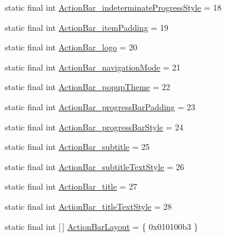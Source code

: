 \begin{DoxyCompactItemize}
\item 
static final int \mbox{\hyperlink{classandroid_1_1support_1_1v7_1_1appcompat_1_1R_1_1styleable_a7577229b463e9b7130c54def73c2afd7}{Action\+Bar\+\_\+indeterminate\+Progress\+Style}} = 18
\item 
static final int \mbox{\hyperlink{classandroid_1_1support_1_1v7_1_1appcompat_1_1R_1_1styleable_a315cf68c96fdaec15e402b40dda940d7}{Action\+Bar\+\_\+item\+Padding}} = 19
\item 
static final int \mbox{\hyperlink{classandroid_1_1support_1_1v7_1_1appcompat_1_1R_1_1styleable_a56f0a3f5be9ab67dec4dd2251204ba70}{Action\+Bar\+\_\+logo}} = 20
\item 
static final int \mbox{\hyperlink{classandroid_1_1support_1_1v7_1_1appcompat_1_1R_1_1styleable_afedf914ccaf1bb5ca9002e42ed54d533}{Action\+Bar\+\_\+navigation\+Mode}} = 21
\item 
static final int \mbox{\hyperlink{classandroid_1_1support_1_1v7_1_1appcompat_1_1R_1_1styleable_ad01a2a11a37482bb9449f38fbad79527}{Action\+Bar\+\_\+popup\+Theme}} = 22
\item 
static final int \mbox{\hyperlink{classandroid_1_1support_1_1v7_1_1appcompat_1_1R_1_1styleable_a3d7a77efb74431150b14219b00be5bef}{Action\+Bar\+\_\+progress\+Bar\+Padding}} = 23
\item 
static final int \mbox{\hyperlink{classandroid_1_1support_1_1v7_1_1appcompat_1_1R_1_1styleable_a6e926db9394b2fb80b912d0e660c879c}{Action\+Bar\+\_\+progress\+Bar\+Style}} = 24
\item 
static final int \mbox{\hyperlink{classandroid_1_1support_1_1v7_1_1appcompat_1_1R_1_1styleable_a5c8269ff62c5e3b0abcaf99c6fe524b3}{Action\+Bar\+\_\+subtitle}} = 25
\item 
static final int \mbox{\hyperlink{classandroid_1_1support_1_1v7_1_1appcompat_1_1R_1_1styleable_a781dc187d0cfb26129ebda2fdcaa0643}{Action\+Bar\+\_\+subtitle\+Text\+Style}} = 26
\item 
static final int \mbox{\hyperlink{classandroid_1_1support_1_1v7_1_1appcompat_1_1R_1_1styleable_a19035537ac5f35fe63e49623336b62b3}{Action\+Bar\+\_\+title}} = 27
\item 
static final int \mbox{\hyperlink{classandroid_1_1support_1_1v7_1_1appcompat_1_1R_1_1styleable_a77bef956ecd272f3533af6b1ca36854d}{Action\+Bar\+\_\+title\+Text\+Style}} = 28
\item 
static final int \mbox{[}$\,$\mbox{]} \mbox{\hyperlink{classandroid_1_1support_1_1v7_1_1appcompat_1_1R_1_1styleable_a130715398cd11a55fefd1a376c18092e}{Action\+Bar\+Layout}} = \{ 0x010100b3 \}

\end{DoxyCompactItemize}
